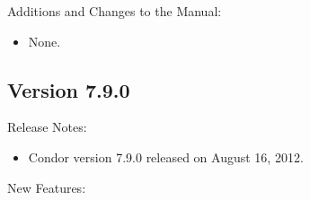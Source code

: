 \noindent Additions and Changes to the Manual:

\begin{itemize}

\item None.

\end{itemize}


\subsection*{\label{sec:New-7-9-0}Version 7.9.0}

\noindent Release Notes:

\begin{itemize}

\item Condor version 7.9.0 released on August 16, 2012.

\end{itemize}


\noindent New Features:

